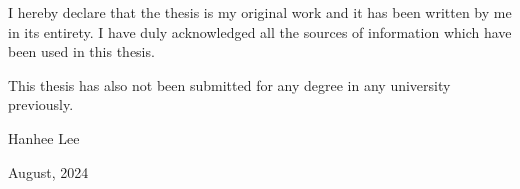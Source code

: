 I hereby declare that the thesis is my original work and it has been written by 
me in its entirety. I have duly acknowledged all the sources of information 
which have been used in this thesis. 
    
    \vspace{1em} \noindent This thesis has also not been submitted for any degree in any university previously.
    
    \vspace{1em} \noindent Hanhee Lee
    
    \vspace{1em} \noindent August, 2024